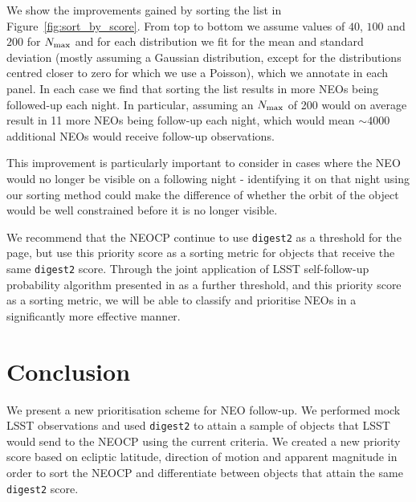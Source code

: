 \documentclass[twocolumn]{aastex631}
\newcommand{\dig}{\texttt{digest2}}
\begin{document}
We show the improvements gained by sorting the list in Figure~\ref{fig:sort_by_score}. From top to bottom we assume values of $40$, $100$ and $200$ for $N_{\rm max}$ and for each distribution we fit for the mean and standard deviation (mostly assuming a Gaussian distribution, except for the distributions centred closer to zero for which we use a Poisson), which we annotate in each panel. In each case we find that sorting the list results in more NEOs being followed-up each night. In particular, assuming an $N_{\rm max}$ of 200 would on average result in 11 more NEOs being follow-up each night, which would mean ${\sim}4000$ additional NEOs would receive follow-up observations.

This improvement is particularly important to consider in cases where the NEO would no longer be visible on a following night - identifying it on that night using our sorting method could make the difference of whether the orbit of the object would be well constrained before it is no longer visible.

We recommend that the NEOCP continue to use \dig{} as a threshold for the page, but use this priority score as a sorting metric for objects that receive the same \dig{} score. Through the joint application of LSST self-follow-up probability algorithm presented in \citep{sky-is-falling} as a further threshold, and this priority score as a sorting metric, we will be able to classify and prioritise NEOs in a significantly more effective manner.

\section{Conclusion}

We present a new prioritisation scheme for NEO follow-up. We performed mock LSST observations and used \dig{} to attain a sample of objects that LSST would send to the NEOCP using the current criteria. We created a new priority score based on ecliptic latitude, direction of motion and apparent magnitude in order to sort the NEOCP and differentiate between objects that attain the same \dig{} score.
\end{document}

